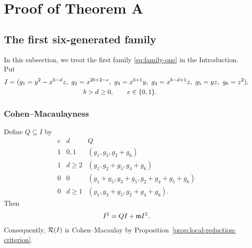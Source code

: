 \section{Proof of Theorem A}
\label{sec:main-theorem}

\subsection{The first six-generated family}
\label{sec:family-one}

In this subsection, we treat the first family \eqref{eq:family-one} in the Introduction. Put
$$
\begin{aligned}
 I={}&( g_1 = y^2-x^{b-d}z,\ g_2 = x^{2b+2-e},\ g_3 = x^{b+1}y,\
        g_4 = x^{b-d+1}z,\ g_5 = yz,\ g_6 = z^2),\\
 &\hspace{35mm} b>d\geq0,\qquad e\in\{0,1\}.
\end{aligned}
$$

\subsubsection{Cohen--Macaulayness}

\begin{proposition}
\label{prop:family-one-local-reductions}
Define $Q\subseteq I$ by
\[
\begin{array}{c|c|l}
 e&d&Q\\ \hline
 1&0,1&(g_1,g_5,g_2+g_6)\\
 1&d\geq2&(g_1,g_2+g_5,g_4+g_6)\\
 0&0&(g_1+g_5,g_3+g_5,g_2+g_4+g_5+g_6)\\
 0&d\geq1&(g_1,g_3+g_5,g_2+g_4+g_6).
\end{array}
\]
Then
\[
 I^2=QI+\mathfrak m I^2.
\]
Consequently, $\mathcal R(I)$ is Cohen--Macaulay by Proposition~\ref{prop:local-reduction-criterion}.
\end{proposition}


